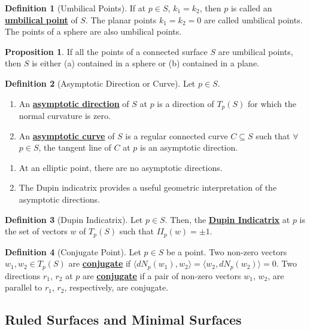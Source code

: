 \documentclass[11pt]{scrartcl}
\theoremstyle{definition}
\newtheorem{definition}{Definition}
\newtheorem{prop}{Proposition}
\theoremstyle{remark}
\newcommand{\dfn}[1]{\textbf{\underline{#1}}}
\begin{document}
{\begin{definition}[Umbilical Points]
	If at $p \in S$, $k_1 = k_2$, then $p$ is called an \dfn{umbilical point} of $S$. The planar points $k_1 = k_2 = 0$ are called umbilical points. The points of a sphere are also umbilical points. 
\end{definition}

\begin{prop}
	If all the points of a connected surface $S$ are umbilical points, then $S$ is either (a) contained in a sphere or (b) contained in a plane. 
\end{prop}

\begin{definition}[Asymptotic Direction or Curve]
	Let $p \in S$. 
	\begin{enumerate}[noitemsep]
		\item An \dfn{asymptotic direction} of $S$ at $p$ is a direction of $T_p(S)$ for which the normal curvature is zero. 
		\item An \dfn{asymptotic curve} of $S$ is a regular connected curve $C \subseteq S$ such that $\forall$ $p \in S$, the tangent line of $C$ at $p$ is an asymptotic direction. 
	\end{enumerate}
\end{definition}

\begin{enumerate}[noitemsep]
	\item At an elliptic point, there are no asymptotic directions. 
	\item The Dupin indicatrix provides a useful geometric interpretation of the asymptotic directions. 
\end{enumerate}

\begin{definition}[Dupin Indicatrix] 
	Let $p \in S$. Then, the \dfn{Dupin Indicatrix} at $p$ is the set of vectors $w$ of $T_p(S)$ such that $II_p(w) = \pm 1$. 
\end{definition}

\begin{definition}[Conjugate Point]
	Let $p \in S$ be a point. Two non-zero vectors $w_1, w_2 \in T_p(S)$ are \dfn{conjugate} if $\langle dN_p(w_1), w_2 \rangle = \langle w_2, dN_p(w_2) \rangle = 0$. Two directions $r_1$, $r_2$ at $p$ are \dfn{conjugate} if a pair of non-zero vectors $w_1$, $w_2$, are parallel to $r_1$, $r_2$, respectively, are conjugate. 
\end{definition}


\subsection{Ruled Surfaces and Minimal Surfaces}
}
\end{document}
